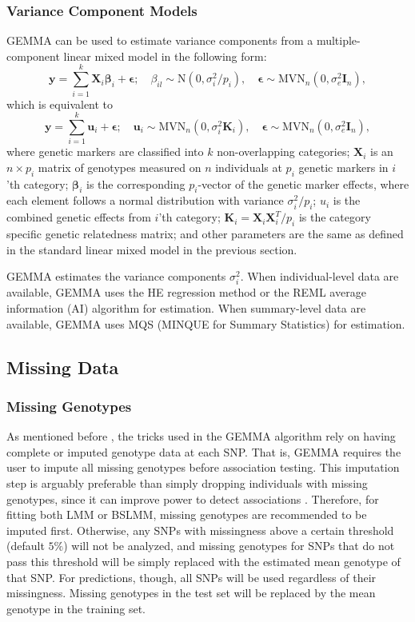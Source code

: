 \documentclass[11pt]{article}
\newcommand{\by}{\mathbf{y}}
\newcommand{\bu}{\mathbf{u}}
\newcommand{\bK}{\mathbf{K}}
\newcommand{\bX}{\mathbf{X}}
\newcommand{\bI}{\mathbf{I}}
\newcommand{\bepsilon}{\boldsymbol\epsilon}
\newcommand{\bbeta}{\boldsymbol\beta}
\begin{document}
\subsubsection{Variance Component Models}

GEMMA can be used to estimate variance components from a
multiple-component linear mixed model in the following form:
%
\begin{equation*}
\by=\sum_{i=1}^k \bX_i\bbeta_i+\bepsilon;
\quad \beta_{il} \sim \mbox{N}(0, \sigma_i^2/p_i),
\quad \bepsilon \sim \mbox{MVN}_n(0, \sigma_e^2 \bI_n),
\end{equation*}
%
which is equivalent to
%
\begin{equation*}
\by=\sum_{i=1}^k \bu_i +\bepsilon;
\quad \bu_i \sim \mbox{MVN}_n(0, \sigma_i^2 \bK_i),
\quad \bepsilon \sim \mbox{MVN}_n(0, \sigma_e^2 \bI_n),
\end{equation*}
%
where genetic markers are classified into $k$ non-overlapping
categories; $\bX_i$ is an $n \times p_i$ matrix of genotypes measured
on $n$ individuals at $p_i$ genetic markers in $i$'th category;
$\bbeta_i$ is the corresponding $p_i$-vector of the genetic marker
effects, where each element follows a normal distribution with
variance $\sigma_i^2/p_i$; $u_i$ is the combined genetic effects from
$i$'th category; $\bK_i=\bX_i\bX_i^T/p_i$ is the category specific
genetic relatedness matrix; and other parameters are the same as
defined in the standard linear mixed model in the previous section.

GEMMA estimates the variance components $\sigma_i^2$. When
individual-level data are available, GEMMA uses the HE regression
method or the REML average information (AI) algorithm for
estimation. When summary-level data are available, GEMMA uses MQS
(MINQUE for Summary Statistics) for estimation.

\subsection{Missing Data}

\subsubsection{Missing Genotypes}

As mentioned before \cite{Zhou:2012}, the tricks used in the GEMMA
algorithm rely on having complete or imputed genotype data at each
SNP. That is, GEMMA requires the user to impute all missing genotypes
before association testing. This imputation step is arguably
preferable than simply dropping individuals with missing genotypes,
since it can improve power to detect associations \cite{Guan:2008}.
Therefore, for fitting both LMM or BSLMM, missing genotypes are
recommended to be imputed first. Otherwise, any SNPs with missingness
above a certain threshold (default $5\%$) will not be analyzed, and
missing genotypes for SNPs that do not pass this threshold will be
simply replaced with the estimated mean genotype of that SNP. For
predictions, though, all SNPs will be used regardless of their
missingness. Missing genotypes in the test set will be replaced by the
mean genotype in the training set.
\end{document}
